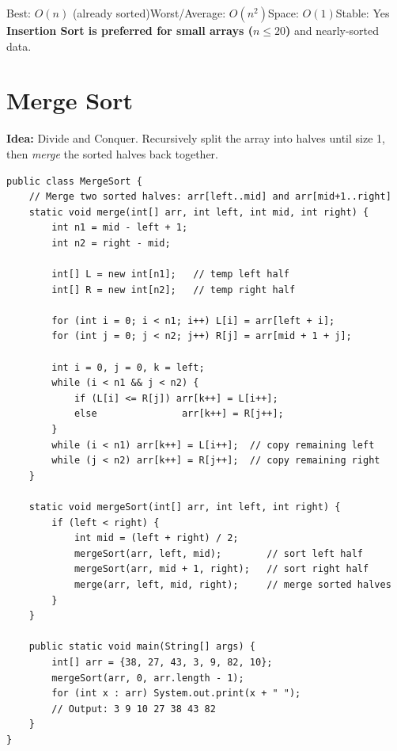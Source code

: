 \documentclass[12pt,a4paper,oneside]{book}
\begin{document}
\begin{complexity}
Best: $O(n)$ (already sorted)\quad Worst/Average: $O(n^2)$\quad Space: $O(1)$\quad Stable: Yes\\[4pt]
\textbf{Insertion Sort is preferred for small arrays ($n \leq 20$)} and nearly-sorted data.
\end{complexity}

\section{Merge Sort}

\textbf{Idea:} Divide and Conquer. Recursively split the array into halves until size 1, then \textit{merge} the sorted halves back together.

\begin{lstlisting}[caption={Merge Sort --- stable O(n log n) guaranteed}]
public class MergeSort {
    // Merge two sorted halves: arr[left..mid] and arr[mid+1..right]
    static void merge(int[] arr, int left, int mid, int right) {
        int n1 = mid - left + 1;
        int n2 = right - mid;

        int[] L = new int[n1];   // temp left half
        int[] R = new int[n2];   // temp right half

        for (int i = 0; i < n1; i++) L[i] = arr[left + i];
        for (int j = 0; j < n2; j++) R[j] = arr[mid + 1 + j];

        int i = 0, j = 0, k = left;
        while (i < n1 && j < n2) {
            if (L[i] <= R[j]) arr[k++] = L[i++];
            else               arr[k++] = R[j++];
        }
        while (i < n1) arr[k++] = L[i++];  // copy remaining left
        while (j < n2) arr[k++] = R[j++];  // copy remaining right
    }

    static void mergeSort(int[] arr, int left, int right) {
        if (left < right) {
            int mid = (left + right) / 2;
            mergeSort(arr, left, mid);        // sort left half
            mergeSort(arr, mid + 1, right);   // sort right half
            merge(arr, left, mid, right);     // merge sorted halves
        }
    }

    public static void main(String[] args) {
        int[] arr = {38, 27, 43, 3, 9, 82, 10};
        mergeSort(arr, 0, arr.length - 1);
        for (int x : arr) System.out.print(x + " ");
        // Output: 3 9 10 27 38 43 82
    }
}
\end{lstlisting}
\end{document}
